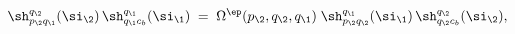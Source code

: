 \begin{equation}\label{elembraid}
\sh_{p_\2q_\1}^{q_\2}(\si_{\2})\,
\sh_{q_\1c_b}^{q_\1}(\si_{\1})\;=\;
\Omega^{\ep}(p_\2,q_\2,q_\1)\;
\sh_{p_\2q_\2}^{q_\1}(\si_{\1})\,\sh_{q_\2c_b}^{q_\2}(\si_{\2}),
\end{equation}

